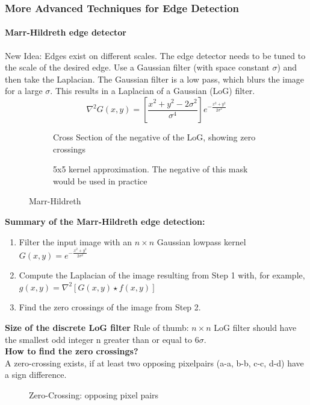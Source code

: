 \subsubsection{More Advanced Techniques for Edge Detection}
\paragraph{Marr-Hildreth edge detector}
New Idea: Edges exist on different scales. The edge detector needs to be tuned to the scale of the desired edge. Use a Gaussian filter (with space constant $\sigma$) and then take the Laplacian. The Gaussian filter is a low pass, which blurs the image for a large $\sigma$. This results in a Laplacian of a Gaussian (LoG) filter.
\[
	\nabla^2 G(x,y) = \left[ \frac{x^2 + y^2 - 2 \sigma^2}{\sigma^4 } \right] e^{-\frac{x^2+y^2}{2 \sigma^2}}
\]

\begin{figure}[h]
	\centering
	\begin{subfigure}[b]{0.45\textwidth}
		\centering
		\caption{Cross Section of the negative of the LoG, showing zero crossings}
	\end{subfigure}
	\begin{subfigure}[b]{0.45\textwidth}
		\centering
		\caption{5x5 kernel approximation. The negative of this mask would be used in practice}
	\end{subfigure}
	\caption{Marr-Hildreth}
\end{figure}

\textbf{Summary of the Marr-Hildreth edge detection:}
\begin{enumerate}
\item Filter the input image with an $n \times n$ Gaussian lowpass kernel $G(x,y)=e^{-\frac{x^2+y^2}{2\sigma^2}}$
\item Compute the Laplacian of the image resulting from Step 1 with, for example, $g(x,y) = \nabla ^2[G(x,y) \star f(x,y)]$
\item Find the zero crossings of the image from Step 2.
\end{enumerate}
\textbf{Size of the discrete LoG filter}
Rule of thumb: $n \times n$ LoG filter should have the smallest odd integer n greater than or equal to $6\sigma$.\\
\textbf{How to find the zero crossings?}\\
A zero-crossing exists, if at least two opposing pixelpairs (a-a, b-b, c-c, d-d) have a sign difference.
\begin{figure}[!h]
	\centering
	\caption{Zero-Crossing: opposing pixel pairs}
\end{figure}

